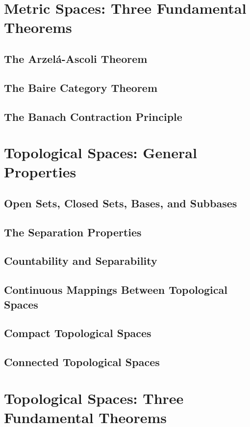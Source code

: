 \documentclass[a4paper,10pt]{book}
\theoremstyle{plain} %
\begin{document}
\chapter{Metric Spaces: Three Fundamental Theorems}

\section{The Arzel\'a-Ascoli Theorem}
\section{The Baire Category Theorem}
\section{The Banach Contraction Principle}

\chapter{Topological Spaces: General Properties}

\section{Open Sets, Closed Sets, Bases, and Subbases}
\section{The Separation Properties}
\section{Countability and Separability}
\section{Continuous Mappings Between Topological Spaces}
\section{Compact Topological Spaces}
\section{Connected Topological Spaces}

\chapter{Topological Spaces: Three Fundamental Theorems}
\end{document}
